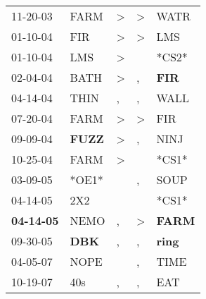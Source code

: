 \begin{supertabular}{p{0.07\textwidth}p{0.06\textwidth}p{0.02\textwidth}p{0.02\textwidth}p{0.06\textwidth}}
          11-20-03\textsuperscript{} &           FARM\textsuperscript{} &     \textgreater &     \textgreater &           WATR\textsuperscript{} \\
          01-10-04\textsuperscript{} &            FIR\textsuperscript{} &     \textgreater &     \textgreater &            LMS\textsuperscript{} \\
          01-10-04\textsuperscript{} &            LMS\textsuperscript{} &     \textgreater &                  &                            *CS2* \\
          02-04-04\textsuperscript{} &           BATH\textsuperscript{} &     \textgreater &                , &   \textbf{FIR\textsuperscript{}} \\
          04-14-04\textsuperscript{} &           THIN\textsuperscript{} &                , &                , &           WALL\textsuperscript{} \\
          07-20-04\textsuperscript{} &           FARM\textsuperscript{} &     \textgreater &     \textgreater &            FIR\textsuperscript{} \\
          09-09-04\textsuperscript{} &  \textbf{FUZZ\textsuperscript{}} &     \textgreater &                , &           NINJ\textsuperscript{} \\
          10-25-04\textsuperscript{} &           FARM\textsuperscript{} &     \textgreater &                  &                            *CS1* \\
          03-09-05\textsuperscript{} &                            *OE1* &                  &                , &           SOUP\textsuperscript{} \\
          04-14-05\textsuperscript{} &            2X2\textsuperscript{} &                  &                  &                            *CS1* \\
 \textbf{04-14-05\textsuperscript{}} &           NEMO\textsuperscript{} &                , &     \textgreater &  \textbf{FARM\textsuperscript{}} \\
          09-30-05\textsuperscript{} &   \textbf{DBK\textsuperscript{}} &                , &                , &  \textbf{ring\textsuperscript{}} \\
          04-05-07\textsuperscript{} &           NOPE\textsuperscript{} &                  &                , &           TIME\textsuperscript{} \\
          10-19-07\textsuperscript{} &            40s\textsuperscript{} &                , &                , &            EAT\textsuperscript{} \\

\end{supertabular}

